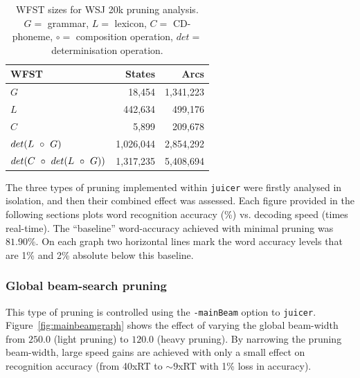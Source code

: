 \documentclass[a4paper,12pt]{report}
\begin{document}
\begin{table}[ht]
\begin{center}
\begin{tabular}{|l|r|r|}
\hline
{\bf WFST} & {\bf States} & {\bf Arcs} \\
\hline
$G$                                                                           &    18,454 & 1,341,223 \\
$L$                                                                           &   442,634 &   499,176 \\
$C$                                                                           &     5,899 &   209,678 \\
$det(L\hspace{2mm}{\circ}\hspace{2mm}G)$                                      & 1,026,044 & 2,854,292 \\
$det(C\hspace{2mm}{\circ}\hspace{2mm}det(L\hspace{2mm}{\circ}\hspace{2mm}G))$ & 1,317,235 & 5,408,694 \\
\hline
\end{tabular}
\caption{WFST sizes for WSJ 20k pruning analysis. ${G}=$ grammar, ${L}=$ lexicon, ${C}=$ CD-phoneme, ${\circ}=$ composition operation, ${det}=$ determinisation operation.}
\label{tab:networksizes}
\end{center}
\end{table}

The three types of pruning implemented within {\tt juicer} were firstly analysed in isolation, and then their combined effect was assessed. Each figure provided in the following sections plots word recognition accuracy (\%) vs. decoding speed (times real-time). The ``baseline'' word-accuracy achieved with minimal pruning was $81.90\%$. On each graph two horizontal lines mark the word accuracy levels that are 1\% and 2\% absolute below this baseline.

\subsubsection{Global beam-search pruning}

This type of pruning is controlled using the {\tt -mainBeam} option to {\tt juicer}. Figure~\ref{fig:mainbeamgraph} shows the effect of varying the global beam-width from $250.0$ (light pruning) to $120.0$ (heavy pruning). By narrowing the pruning beam-width, large speed gains are achieved with only a small effect on recognition accuracy (from 40xRT to $\sim9$xRT with 1\% loss in accuracy). 
\end{document}
